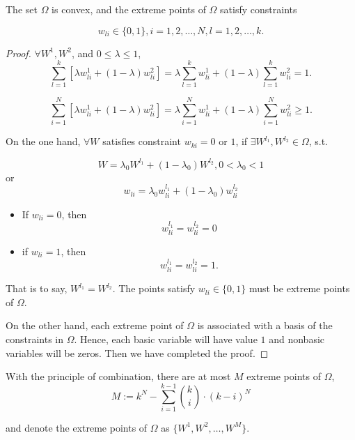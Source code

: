 	\begin{lemma} \label{alo:lem1}
	The set $\Omega$ is convex, and the extreme points of $\Omega$ satisfy constraints

	$$w_{li} \in \{0, 1\}, i = 1, 2, \dots, N, l = 1, 2, \dots, k.$$
	\end{lemma}

	\begin{proof}
	$\forall W^{1}, W^{2}$, and $0 \leq \lambda \leq 1$,
	\begin{equation}
	\sum_{l=1}^{k} [\lambda w_{li}^{1}+(1-\lambda)w_{li}^{2}] = \lambda\sum_{l=1}^{k} w_{li}^{1}+(1-\lambda)\sum_{l=1}^{k}w_{li}^{2} = 1.
	\end{equation}
	
	\begin{equation}
	\sum_{i=1}^{N} [\lambda w_{li}^{1}+(1-\lambda)w_{li}^{2}] = \lambda\sum_{i=1}^{N} w_{li}^{1}+(1-\lambda)\sum_{i=1}^{N}w_{li}^{2} \geq 1.
	\end{equation}

	On the one hand, $\forall W$ satisfies constraint $w_{ki} = 0$ or $1$, if $\exists W^{l_{1}}, W^{l_{2}} \in \Omega$, s.t.

	\[W = \lambda_{0}W^{l_{1}}+(1-\lambda_{0})W^{l_{2}}, 0 < \lambda_{0} <1\]
	or
	\[w_{li}=\lambda_{0} w_{li}^{l_{1}}+(1-\lambda_{0})w_{li}^{l_{2}}\]
	
	\begin{itemize}
	\item If $w_{li} = 0$, then 
	\[w_{li}^{l_{1}}=w_{li}^{l_{2}}=0\]
	\item if $w_{li} = 1$, then
	\[w_{li}^{l_{1}}=w_{li}^{l_{2}}=1.\]
	\end{itemize}
	That is to say, $W^{l_{1}}= W^{l_{2}}$. The points satisfy $w_{li} \in \{0, 1\}$ must be extreme points of  $\Omega$.

	 On the other hand, each extreme point of $\Omega$ is associated with a basis of the constraints in $\Omega$. Hence, each basic variable will have value $1$ and nonbasic variables will be zeros. Then we have completed the proof.
	\end{proof}
	
        \begin{remark}
	With the principle of combination, there are at most $M$ extreme points of $\Omega$,
	\[M := k^{N} - \sum_{i=1}^{k-1} \binom{k}{i} \cdot (k-i)^{N} \]

        and denote the extreme points of $\Omega$ as $\{W^{1}, W^{2}, \dots, W^{M}\}$.
        \end{remark}

